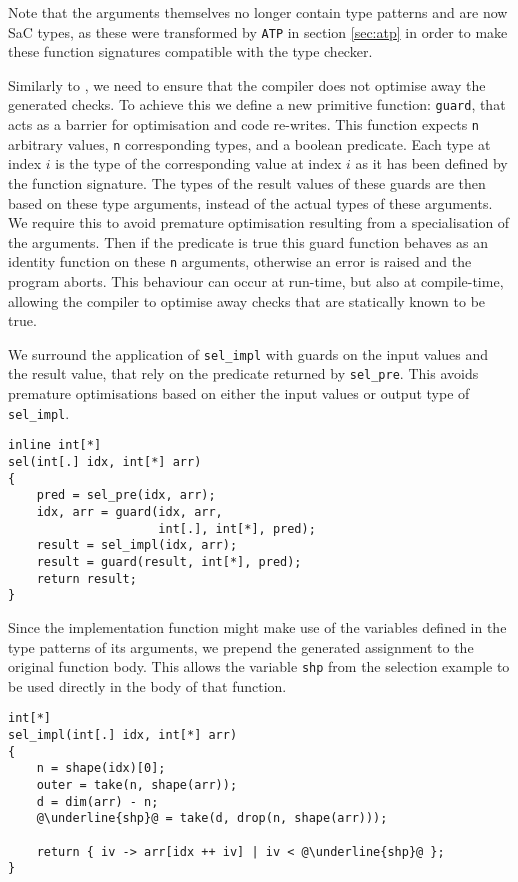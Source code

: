 \noindent
Note that the arguments themselves no longer contain type patterns and are now SaC types, as these were transformed by \texttt{ATP} in section \ref{sec:atp} in order to make these function signatures compatible with the type checker.

Similarly to \cite{sac-contracts}, we need to ensure that the compiler does not optimise away the generated checks.
To achieve this we define a new primitive function: \texttt{guard}, that acts as a barrier for optimisation and code re-writes.
This function expects \texttt{n} arbitrary values, \texttt{n} corresponding types, and a boolean predicate.
Each type at index $i$ is the type of the corresponding value at index $i$ as it has been defined by the function signature.
The types of the result values of these guards are then based on these type arguments, instead of the actual types of these arguments.
We require this to avoid premature optimisation resulting from a specialisation of the arguments.
Then if the predicate is true this guard function behaves as an identity function on these \texttt{n} arguments, otherwise an error is raised and the program aborts.
This behaviour can occur at run-time, but also at compile-time, allowing the compiler to optimise away checks that are statically known to be true.

We surround the application of \texttt{sel\_impl} with guards on the input values and the result value, that rely on the predicate returned by \texttt{sel\_pre}.
This avoids premature optimisations based on either the input values or output type of \texttt{sel\_impl}.
\begin{lstlisting}
inline int[*]
sel(int[.] idx, int[*] arr)
{
    pred = sel_pre(idx, arr);
    idx, arr = guard(idx, arr,
                     int[.], int[*], pred);
    result = sel_impl(idx, arr);
    result = guard(result, int[*], pred);
    return result;
}
\end{lstlisting}

\noindent
Since the implementation function might make use of the variables defined in the type patterns of its arguments, we prepend the generated assignment to the original function body.
This allows the variable \texttt{shp} from the selection example to be used directly in the body of that function.
\begin{lstlisting}[escapechar=@]
int[*]
sel_impl(int[.] idx, int[*] arr)
{
    n = shape(idx)[0];
    outer = take(n, shape(arr));
    d = dim(arr) - n;
    @\underline{shp}@ = take(d, drop(n, shape(arr)));

    return { iv -> arr[idx ++ iv] | iv < @\underline{shp}@ };
}
\end{lstlisting}

